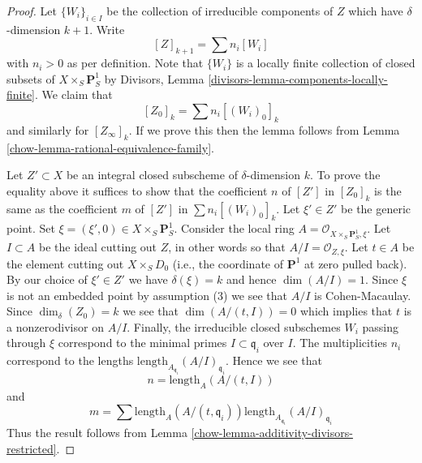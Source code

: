 \begin{proof}

Let $\{W_i\}_{i \in I}$ be the collection of irreducible
components of $Z$ which have $\delta$-dimension $k + 1$.
Write
$$
[Z]_{k + 1} = \sum n_i[W_i]
$$
with $n_i > 0$ as per definition. Note that $\{W_i\}$
is a locally finite collection of closed subsets of
$X \times_S \mathbf{P}^1_S$ by
Divisors, Lemma \ref{divisors-lemma-components-locally-finite}.
We claim that
$$
[Z_0]_k = \sum n_i[(W_i)_0]_k
$$
and similarly for $[Z_\infty]_k$. If we prove this then the lemma
follows from Lemma \ref{chow-lemma-rational-equivalence-family}.

\medskip\noindent
Let $Z' \subset X$ be an integral closed subscheme of $\delta$-dimension $k$.
To prove the equality above it suffices to show that the coefficient $n$
of $[Z']$ in $[Z_0]_k$ is the same as the coefficient $m$ of
$[Z']$ in $\sum n_i[(W_i)_0]_k$. Let $\xi' \in Z'$ be the generic point.
Set $\xi = (\xi', 0) \in  X \times_S \mathbf{P}^1_S$.
Consider the local ring $A = \mathcal{O}_{X \times_S \mathbf{P}^1_S, \xi}$.
Let $I \subset A$ be the ideal cutting out $Z$, in other words so that
$A/I = \mathcal{O}_{Z, \xi}$. Let $t \in A$ be the element cutting
out $X \times_S D_0$ (i.e., the coordinate of $\mathbf{P}^1$ at zero
pulled back). By our choice of $\xi' \in Z'$ we have $\delta(\xi) = k$
and hence $\dim(A/I) = 1$. Since $\xi$ is not an embedded point by
assumption (3) we see that $A/I$ is Cohen-Macaulay. Since $\dim_\delta(Z_0)
= k$ we see that $\dim(A/(t, I)) = 0$ which implies that $t$
is a nonzerodivisor on $A/I$. Finally, the irreducible closed subschemes
$W_i$ passing through $\xi$ correspond to the minimal primes
$I \subset \mathfrak q_i$ over $I$. The multiplicities $n_i$ correspond
to the lengths $\text{length}_{A_{\mathfrak q_i}}(A/I)_{\mathfrak q_i}$.
Hence we see that
$$
n = \text{length}_A(A/(t, I))
$$
and
$$
m = \sum
\text{length}_A(A/(t, \mathfrak q_i))
\text{length}_{A_{\mathfrak q_i}}(A/I)_{\mathfrak q_i}
$$
Thus the result follows from
Lemma \ref{chow-lemma-additivity-divisors-restricted}.
\end{proof}

